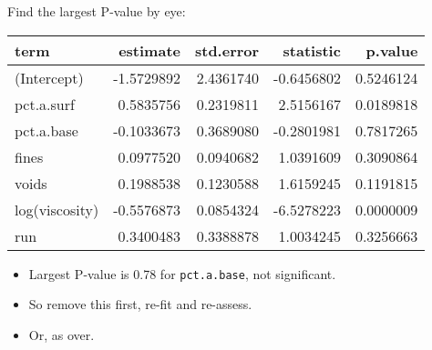 \begin{frame}[fragile]{Find the largest P-value by eye:}
\protect\hypertarget{find-the-largest-p-value-by-eye}{}
\begin{Shaded}
\begin{Highlighting}[]
\NormalTok{)}
\end{Highlighting}
\end{Shaded}

\begin{longtable}[]{@{}lrrrr@{}}
\toprule
term & estimate & std.error & statistic & p.value\tabularnewline
\midrule
\endhead
(Intercept) & -1.5729892 & 2.4361740 & -0.6456802 &
0.5246124\tabularnewline
pct.a.surf & 0.5835756 & 0.2319811 & 2.5156167 &
0.0189818\tabularnewline
pct.a.base & -0.1033673 & 0.3689080 & -0.2801981 &
0.7817265\tabularnewline
fines & 0.0977520 & 0.0940682 & 1.0391609 & 0.3090864\tabularnewline
voids & 0.1988538 & 0.1230588 & 1.6159245 & 0.1191815\tabularnewline
log(viscosity) & -0.5576873 & 0.0854324 & -6.5278223 &
0.0000009\tabularnewline
run & 0.3400483 & 0.3388878 & 1.0034245 & 0.3256663\tabularnewline
\bottomrule
\end{longtable}

\begin{itemize}
\tightlist
\item
  Largest P-value is 0.78 for \texttt{pct.a.base}, not significant.
\item
  So remove this first, re-fit and re-assess.
\item
  Or, as over.
\end{itemize}
\end{frame}

